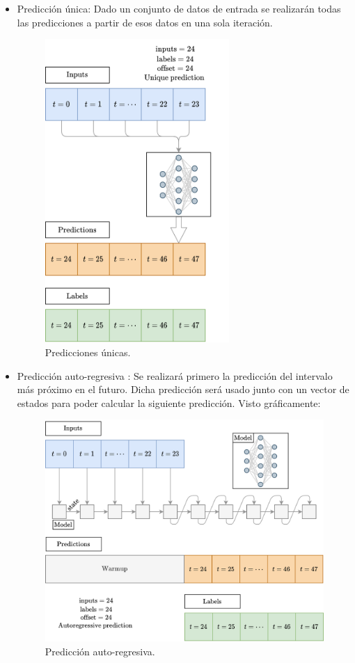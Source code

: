 \begin{itemize}
    \item Predicción única: Dado un conjunto de datos de entrada se realizarán todas las predicciones a partir de esos datos en una sola iteración.
    
    \begin{figure}[H]
    \centering
    \includegraphics[width=7cm]{images/solution/modules/windows/windows-predictions-one-shot.png}
    \caption{Predicciones únicas.}
    \end{figure}

    \item Predicción auto-regresiva \label{window_ar}: Se realizará primero la predicción del intervalo más próximo en el futuro. Dicha predicción será usado junto con un vector de estados para poder calcular la siguiente predicción. Visto gráficamente:
    \begin{figure}[H]
    \centering
    \includegraphics[width=12cm]{images/solution/modules/windows/windows-predictions-ar.png}
    \caption{Predicción auto-regresiva.}
    \end{figure}
\end{itemize}

